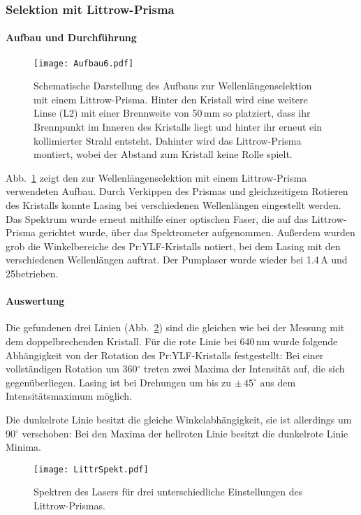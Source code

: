 \subsubsection{Selektion mit Littrow-Prisma}

\paragraph{Aufbau und Durchführung}

\begin{figure}[H]
\begin{center}
  \texttt{[image: Aufbau6.pdf]}
  \caption{Schematische Darstellung des Aufbaus zur Wellenlängenselektion mit einem Littrow-Prisma.
  Hinter den Kristall wird eine weitere Linse (L2) mit einer Brennweite von 50\,mm so
  platziert, dass ihr Brennpunkt im Inneren des Kristalls liegt und hinter ihr erneut ein
  kollimierter Strahl entsteht. Dahinter wird das Littrow-Prisma montiert, wobei der Abstand zum
  Kristall keine Rolle spielt.}
  \label{img:aufbau6}
\end{center}
\end{figure}

Abb.~\ref{img:aufbau6} zeigt den zur Wellenlängenselektion mit einem Littrow-Prisma verwendeten
Aufbau. Durch Verkippen des Prismas und gleichzeitigem Rotieren des Kristalls konnte Lasing bei
verschiedenen Wellenlängen eingestellt werden. Das Spektrum wurde erneut mithilfe einer optischen
Faser, die auf das Littrow-Prisma gerichtet wurde, über das Spektrometer aufgenommen.
Außerdem wurden grob die Winkelbereiche des Pr:YLF-Kristalls notiert, bei dem Lasing
mit den verschiedenen Wellenlängen auftrat.
Der Pumplaser wurde wieder bei 1.4\,A und 25\grad betrieben.

\paragraph{Auswertung}
Die gefundenen drei Linien (Abb.~\ref{img:LittrSpekt}) sind die gleichen wie bei der Messung mit dem
doppelbrechenden Kristall.
Für die rote Linie bei 640\,nm wurde folgende Abhängigkeit von der Rotation des Pr:YLF-Kristalls
festgestellt:
Bei einer vollständigen Rotation um 360$^\circ$ treten zwei Maxima der Intensität auf, die sich
gegenüberliegen.
Lasing ist bei Drehungen um bis zu $\pm\,45^\circ$ aus dem Intensitätsmaximum möglich.

Die dunkelrote Linie besitzt die gleiche Winkelabhängigkeit,
sie ist allerdings um 90$^\circ$ verschoben: Bei den Maxima der hellroten Linie besitzt die
dunkelrote Linie Minima.


\begin{figure}[H]
\begin{center}
  \texttt{[image: LittrSpekt.pdf]}
  \caption{Spektren des Lasers für drei unterschiedliche Einstellungen des Littrow-Prismas.}
  \label{img:LittrSpekt}
\end{center}
\end{figure}
